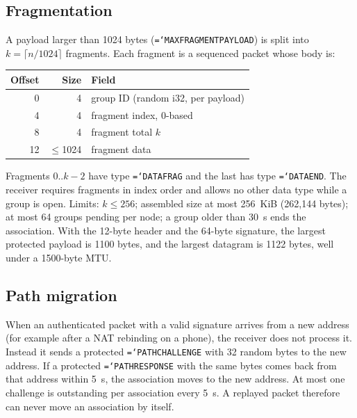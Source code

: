 \documentclass[11pt,a4paper]{article}
\newcommand{\code}[1]{\texttt{\hyphenchar\font=`\-\relax #1}}
\DeclareRobustCommand{\_}{\origunderscore\allowbreak}
\begin{document}
\subsection{Fragmentation}
A payload larger than 1024 bytes (\code{MAX\_FRAGMENT\_PAYLOAD}) is split into
$k = \lceil n / 1024 \rceil$ fragments. Each fragment is a sequenced packet whose body is:
\begin{center}\small
\begin{tabular}{rrl}
\toprule
Offset & Size & Field\\
\midrule
0 & 4 & group ID (random i32, per payload)\\
4 & 4 & fragment index, 0-based\\
8 & 4 & fragment total $k$\\
12 & $\le$1024 & fragment data\\
\bottomrule
\end{tabular}
\end{center}
Fragments $0..k-2$ have type \code{DATA\_FRAG} and the last has type \code{DATA\_END}.
The receiver requires fragments in index order and allows no other data type while a group is
open. Limits: $k \le 256$; assembled size at most 256~KiB (262{,}144 bytes); at most 64
groups pending per node; a group older than 30~s ends the association. With the 12-byte
header and the 64-byte signature, the largest protected payload is 1100 bytes, and the largest
datagram is 1122 bytes, well under a 1500-byte MTU.

\subsection{Path migration}
When an authenticated packet with a valid signature arrives from a new address (for example
after a NAT rebinding on a phone), the receiver does not process it. Instead it sends a
protected \code{PATH\_CHALLENGE} with 32 random bytes to the new address. If a protected
\code{PATH\_RESPONSE} with the same bytes comes back from that address within 5~s, the
association moves to the new address. At most one challenge is outstanding per association
every 5~s. A replayed packet therefore can never move an association by itself.
\end{document}
